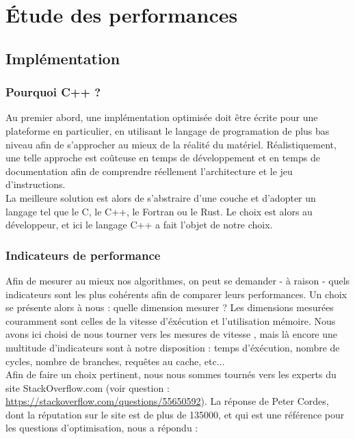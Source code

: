 \section{Étude des performances}

\subsection{Implémentation}
\subsubsection{Pourquoi C++ ?}
Au premier abord, une implémentation optimisée doit être écrite pour une plateforme en particulier, en utilisant le langage de programation de plus bas niveau afin de s'approcher au mieux de la réalité du matériel. Réalistiquement, une telle approche est coûteuse en temps de développement et en temps de documentation afin de comprendre réellement l'architecture et le jeu d'instructions. \\

La meilleure solution est alors de s'abstraire d'une couche et d'adopter un langage tel que le C, le C++, le Fortran ou le Rust. Le choix est alors au développeur, et ici le langage C++ a fait l'objet de notre choix.\\



\subsubsection{Indicateurs de performance}
Afin de mesurer au mieux nos algorithmes, on peut se demander - à raison - quels indicateurs sont les plus cohérents afin de comparer leurs performances. Un choix se présente alors à nous : quelle dimension mesurer ? Les dimensions mesurées couramment sont celles de la vitesse d'éxécution et l'utilisation mémoire. Nous avons ici choisi de nous tourner vers les mesures de vitesse , mais là encore une multitude d'indicateurs sont à notre disposition : temps d'éxécution, nombre de cycles, nombre de branches, requêtes au cache, etc...\\

Afin de faire un choix pertinent, nous nous sommes tournés vers les experts du site StackOverflow.com (voir question : \url{https://stackoverflow.com/questions/55650592}). La réponse de Peter Cordes, dont la réputation sur le site est de plus de 135000, et qui est une référence pour les questions d'optimisation, nous a répondu :\\

